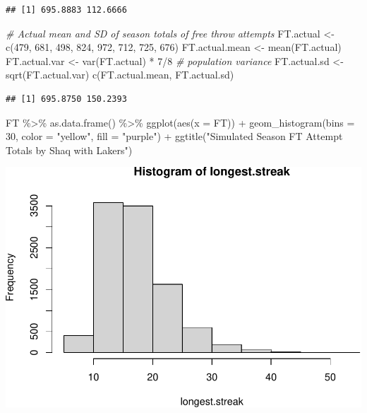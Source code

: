 \documentclass[
  11pt,
]{book}
\newenvironment{Shaded}{\begin{snugshade}}{\end{snugshade}}
\newcommand{\AttributeTok}[1]{\textcolor[rgb]{0.77,0.63,0.00}{#1}}
\newcommand{\CommentTok}[1]{\textcolor[rgb]{0.56,0.35,0.01}{\textit{#1}}}
\newcommand{\DecValTok}[1]{\textcolor[rgb]{0.00,0.00,0.81}{#1}}
\newcommand{\FunctionTok}[1]{\textcolor[rgb]{0.00,0.00,0.00}{#1}}
\newcommand{\NormalTok}[1]{#1}
\newcommand{\OtherTok}[1]{\textcolor[rgb]{0.56,0.35,0.01}{#1}}
\newcommand{\SpecialCharTok}[1]{\textcolor[rgb]{0.00,0.00,0.00}{#1}}
\newcommand{\StringTok}[1]{\textcolor[rgb]{0.31,0.60,0.02}{#1}}
\theoremstyle{definition}
\theoremstyle{definition}
\theoremstyle{definition}
\theoremstyle{definition}
\theoremstyle{remark}
\begin{document}
\begin{verbatim}
## [1] 695.8883 112.6666
\end{verbatim}

\begin{Shaded}
\begin{Highlighting}[]
\CommentTok{\# Actual mean and SD of season totals of free throw attempts}
\NormalTok{FT.actual }\OtherTok{\textless{}{-}} \FunctionTok{c}\NormalTok{(}\DecValTok{479}\NormalTok{, }\DecValTok{681}\NormalTok{, }\DecValTok{498}\NormalTok{, }\DecValTok{824}\NormalTok{, }\DecValTok{972}\NormalTok{, }\DecValTok{712}\NormalTok{, }\DecValTok{725}\NormalTok{, }\DecValTok{676}\NormalTok{)}
\NormalTok{FT.actual.mean }\OtherTok{\textless{}{-}} \FunctionTok{mean}\NormalTok{(FT.actual)}
\NormalTok{FT.actual.var }\OtherTok{\textless{}{-}} \FunctionTok{var}\NormalTok{(FT.actual) }\SpecialCharTok{*} \DecValTok{7}\SpecialCharTok{/}\DecValTok{8}  \CommentTok{\# population variance}
\NormalTok{FT.actual.sd }\OtherTok{\textless{}{-}} \FunctionTok{sqrt}\NormalTok{(FT.actual.var)}
\FunctionTok{c}\NormalTok{(FT.actual.mean, FT.actual.sd)}
\end{Highlighting}
\end{Shaded}

\begin{verbatim}
## [1] 695.8750 150.2393
\end{verbatim}

\begin{Shaded}
\begin{Highlighting}[]
\NormalTok{FT }\SpecialCharTok{\%\textgreater{}\%}
    \FunctionTok{as.data.frame}\NormalTok{() }\SpecialCharTok{\%\textgreater{}\%}
    \FunctionTok{ggplot}\NormalTok{(}\FunctionTok{aes}\NormalTok{(}\AttributeTok{x =}\NormalTok{ FT)) }\SpecialCharTok{+} \FunctionTok{geom\_histogram}\NormalTok{(}\AttributeTok{bins =} \DecValTok{30}\NormalTok{, }\AttributeTok{color =} \StringTok{"yellow"}\NormalTok{, }\AttributeTok{fill =} \StringTok{"purple"}\NormalTok{) }\SpecialCharTok{+}
    \FunctionTok{ggtitle}\NormalTok{(}\StringTok{"Simulated Season FT Attempt Totals by Shaq with Lakers"}\NormalTok{)}
\end{Highlighting}
\end{Shaded}

\includegraphics{series_files/figure-latex/unnamed-chunk-74-1.pdf}
\end{document}
